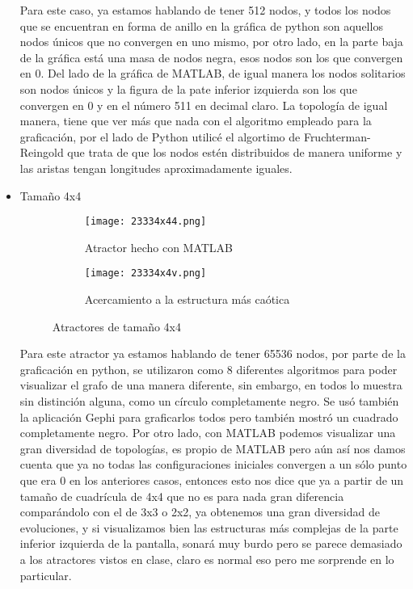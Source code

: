 \documentclass{article}
\begin{document}
\begin{itemize}
 	Para este caso, ya estamos hablando de tener 512 nodos, y todos los nodos que se encuentran en forma de anillo en la gráfica de python son aquellos nodos únicos que no convergen en uno mismo, por otro lado, en la parte baja de la gráfica está una masa de nodos negra, esos nodos son los que convergen en 0. Del lado de la gráfica de MATLAB, de igual manera los nodos solitarios son nodos únicos y la figura de la pate inferior izquierda son los que convergen en 0 y en el número 511 en decimal claro. La topología de igual manera, tiene que ver más que nada con el algoritmo empleado para la graficación, por el lado de Python utilicé el algortimo de Fruchterman-Reingold que trata  de que los nodos estén distribuidos de manera uniforme y las aristas tengan longitudes aproximadamente iguales.
 	
 	\vspace{100pt}
 	\item Tamaño 4x4
 	
 			\begin{figure}[htbp]
 			\centering
 			\begin{subfigure}{0.48\textwidth}
 				\centering
 				\texttt{[image: 23334x44.png]}
 				\caption{Atractor hecho con MATLAB}
 				\label{fig:A5}
 			\end{subfigure}
 			\hfill
 			\begin{subfigure}{0.48\textwidth}
 				\centering
 				\texttt{[image: 23334x4v.png]}
 				\caption{Acercamiento a la estructura más caótica}
 				\label{fig:A6}
 			\end{subfigure}
 			\caption{Atractores de tamaño 4x4}
 			\label{fig:A}
 		\end{figure}
 	
 	Para este atractor ya estamos hablando de tener 65536 nodos, por parte de la graficación en python, se utilizaron como 8 diferentes algoritmos para poder visualizar el grafo de una manera diferente, sin embargo, en todos lo muestra sin distinción alguna, como un círculo completamente negro. Se usó también la aplicación Gephi para graficarlos todos pero también mostró un cuadrado completamente negro. Por otro lado, con MATLAB podemos visualizar una gran diversidad de topologías, es propio de MATLAB pero aún así nos damos cuenta que ya no todas las configuraciones iniciales convergen a un sólo punto que era 0 en los anteriores casos, entonces esto nos dice que ya a partir de un tamaño de cuadrícula de 4x4 que no es para nada gran diferencia comparándolo con el de 3x3 o 2x2, ya obtenemos una gran diversidad de evoluciones, y si visualizamos bien las estructuras más complejas de la parte inferior izquierda de la pantalla, sonará muy burdo pero se parece demasiado a los atractores vistos en clase, claro es normal eso pero me sorprende en lo particular. 
 	

\end{itemize}
\end{document}
